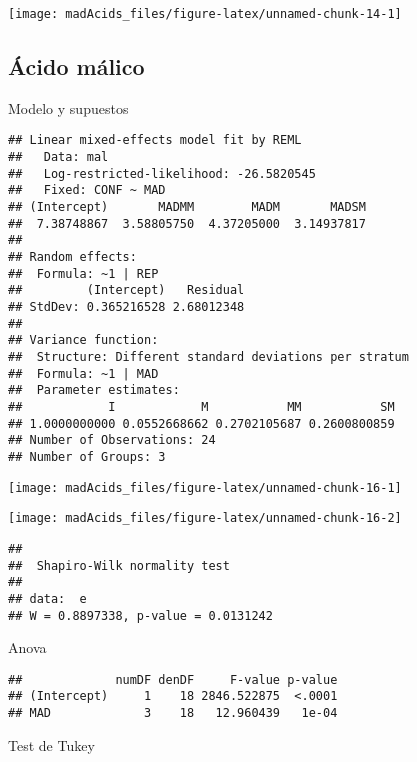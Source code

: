 \documentclass[
]{article}
\begin{document}
\begin{center}\texttt{[image: madAcids\_files/figure-latex/unnamed-chunk-14-1]} \end{center}

\subsection{Ácido málico}\label{uxe1cido-muxe1lico}

Modelo y supuestos

\begin{verbatim}
## Linear mixed-effects model fit by REML
##   Data: mal 
##   Log-restricted-likelihood: -26.5820545
##   Fixed: CONF ~ MAD 
## (Intercept)       MADMM        MADM       MADSM 
##  7.38748867  3.58805750  4.37205000  3.14937817 
## 
## Random effects:
##  Formula: ~1 | REP
##         (Intercept)   Residual
## StdDev: 0.365216528 2.68012348
## 
## Variance function:
##  Structure: Different standard deviations per stratum
##  Formula: ~1 | MAD 
##  Parameter estimates:
##            I            M           MM           SM 
## 1.0000000000 0.0552668662 0.2702105687 0.2600800859 
## Number of Observations: 24
## Number of Groups: 3
\end{verbatim}

\begin{center}\texttt{[image: madAcids\_files/figure-latex/unnamed-chunk-16-1]} \end{center}

\begin{center}\texttt{[image: madAcids\_files/figure-latex/unnamed-chunk-16-2]} \end{center}

\begin{verbatim}
## 
##  Shapiro-Wilk normality test
## 
## data:  e
## W = 0.8897338, p-value = 0.0131242
\end{verbatim}

Anova

\begin{verbatim}
##             numDF denDF     F-value p-value
## (Intercept)     1    18 2846.522875  <.0001
## MAD             3    18   12.960439   1e-04
\end{verbatim}

Test de Tukey
\end{document}
